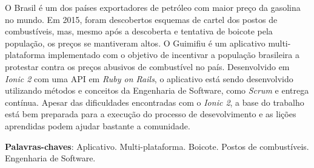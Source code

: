 \begin{resumo}

O Brasil é um dos países exportadores de petróleo com maior preço da gasolina no mundo. Em 2015, foram descobertos esquemas de cartel dos postos de combustíveis, mas, mesmo após a descoberta e tentativa de boicote pela população, os preços se mantiveram altos. O Guimifiu é um aplicativo multi-plataforma implementado com o objetivo de incentivar a população brasileira a protestar contra os preços abusivos de combustível no país. Desenvolvido em \textit{Ionic 2} com uma API em \textit{Ruby on Rails}, o aplicativo está sendo desenvolvido utilizando métodos e conceitos da Engenharia de Software, como \textit{Scrum} e entrega contínua. Apesar das dificuldades encontradas com o \textit{Ionic 2}, a base do trabalho está bem preparada para a execução do processo de desevolvimento e as lições aprendidas podem ajudar bastante a comunidade.

 \vspace{\onelineskip}

 \noindent
 \textbf{Palavras-chaves}: Aplicativo. Multi-plataforma. Boicote. Postos de combustíveis. Engenharia de Software. 
\end{resumo}
